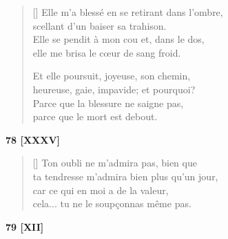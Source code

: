 \documentclass[a4paper,12pt]{book}
\begin{document}
\begin{verse}[\versewidth]
  Elle m'a blessé en se retirant dans l'ombre, \\
  scellant d'un baiser sa trahison. \\
  Elle se pendit à mon cou et, dans le dos, \\
  elle me brisa le cœur de sang froid.

  Et elle poursuit, joyeuse, son chemin, \\
  heureuse, gaie, impavide; et pourquoi? \\
  Parce que la blessure ne saigne pas, \\
  parce que le mort est debout.
\end{verse}

\bigskip

\begin{center}
  \textbf{78 [XXXV]}
\end{center}

\settowidth{\versewidth}{Ton oubli ne m'admira pas! Bien que d'un jour}

\begin{verse}[\versewidth]
  Ton oubli ne m'admira pas, bien que \\
  ta tendresse m'admira bien plus qu'un jour, \\
  car ce qui en moi a de la valeur, \\
  cela... tu ne le soupçonnas même pas.
\end{verse}

\bigskip

\begin{center}
  \textbf{79 [XII]}
\end{center}

\settowidth{\versewidth}{Petite, parce que tes yeux}
\end{document}
